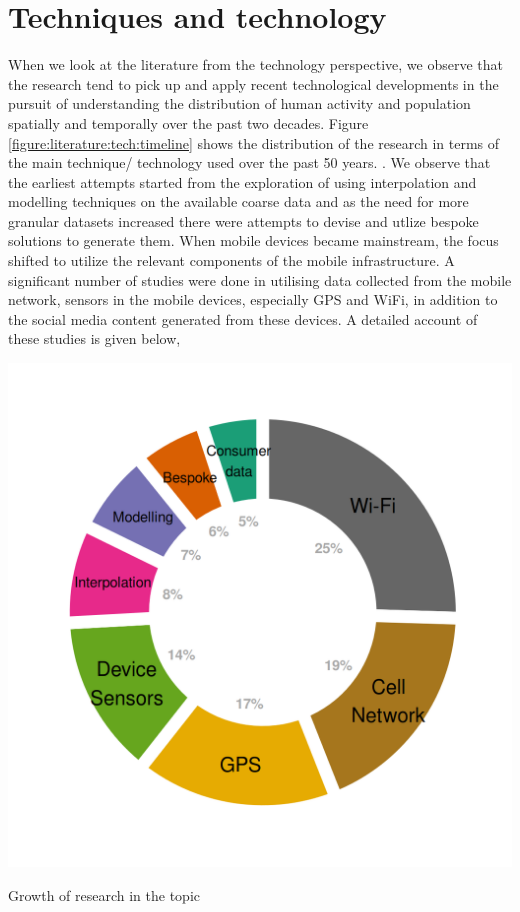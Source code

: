\section{Techniques and technology}

When we look at the literature from the technology perspective, we observe that the research tend to pick up and apply recent technological developments in the pursuit of understanding the distribution of human activity and population spatially and temporally over the past two decades.
Figure \ref{figure:literature:tech:timeline} shows the distribution of the research in terms of the main technique/ technology used over the past 50 years.
. We observe that the earliest attempts started from the exploration of using interpolation and modelling techniques on the available coarse data and as the need for more granular datasets increased there were attempts to devise and utlize bespoke solutions to generate them.
When mobile devices became mainstream, the focus shifted to utilize the relevant components of the mobile infrastructure.
A significant number of studies were done in utilising data collected from the mobile network, sensors in the mobile devices, especially GPS and WiFi, in addition to the social media content generated from these devices.
A detailed account of these studies is given below,

\begin{marginfigure}[-7.5cm]
  \forcerectofloat
  \includegraphics[trim={1.1cm 1cm 1cm 1cm},clip]{images/literature-technology.png}
  \caption{Growth of research in the topic}
  \label{figure:literature:timeline}
  \forcerectofloat
\end{marginfigure}

